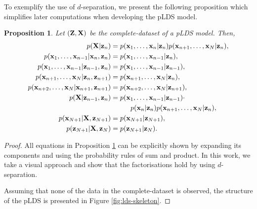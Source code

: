 \documentclass[12pt, oneside]{book}
\numberwithin{equation}{section}
\newcommand{\x}{{\bf x}}
\newcommand{\z}{{\bf z}}
\newtheorem{proposition}{Proposition}[section]
\begin{document}
{%

To exemplify the use of $d$-separation, we present the following proposition which simplifies later computations when developing the pLDS model.

\begin{proposition} \label{prop:graphical-models-separation}
	Let $({\bf Z}, {\bf X})$ be the complete-dataset of a pLDS model. Then,
	\begin{align}
		p({\bf X}\vert\z_n) &= p({\x_1, \ldots, \x_n \vert \z_n})p({\x_{n+1}, \ldots, \x_N \vert \z_n}), \label{eq:gm-1}\\
		p(\x_1, \ldots, \x_{n-1}\vert \x_n, \z_n) &= p(\x_1, \ldots, \x_{n-1}\vert \z_n), \label{eq:gm-2}\\
		p(\x_1, \ldots, \x_{n-1}\vert \z_{n-1}, \z_{n}) &= p(\x_1, \ldots, \x_{n-1}\vert \z_{n-1}), \label{eq:gm-3}\\
		p(\x_{n+1}, \ldots, \x_N \vert \z_n, \z_{n+1}) &= p(\x_{n+1}, \ldots, \x_N \vert \z_n), \label{eq:gm-4}\\
		p(\x_{n+2}, \ldots, \x_N\vert \x_{n+1}, \z_{n+1}) &= p(\x_{n+2}, \ldots, \x_N \vert \z_{n+1}),\label{eq:gm-5}\\
		p({\bf X}\vert \z_{n-1}, \z_{n}) &= p(\x_1, \ldots, \x_{n-1}\vert \z_{n-1})\cdot \nonumber\\
			&\hspace{1cm}p(\x_n\vert \z_n) p(\x_{n+1}, \ldots, \x_N \vert \z_n), \label{eq:gm-6}\\
		p(\x_{N+1} \vert {\bf X}, \z_{N+1}) &= p(\x_{N+1} \vert \z_{N+1}), \label{eq:gm-7}\\
		p(\z_{N+1} \vert {\bf X}, \z_{N}) &= p(\z_{N+1} \vert \z_{N}). \label{eq:gm-8}\\
	\end{align}
\end{proposition}

\begin{proof}
	All equations in Proposition \ref{prop:graphical-models-separation} can be explicitly shown by expanding its components and using the probability rules of sum and product. In this work, we take a visual approach and show that the factorisations hold by using $d$-separation.
	
	Assuming that none of the data in the complete-dataset is observed, the structure of the pLDS is presented in Figure \ref{fig:lds-skeleton}.
	

\end{proof}}
\end{document}
